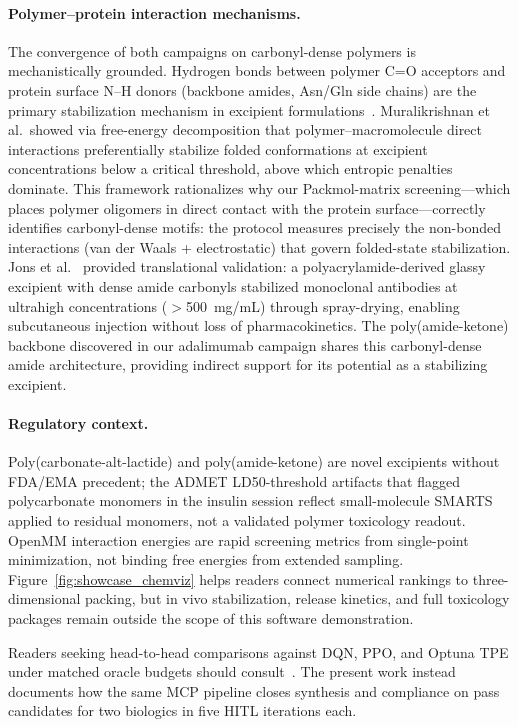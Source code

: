 \documentclass[twocolumn]{fairmeta}
\begin{document}
\paragraph{Polymer--protein interaction mechanisms.}
The convergence of both campaigns on carbonyl-dense polymers is mechanistically grounded.
Hydrogen bonds between polymer C=O acceptors and protein surface N--H donors (backbone amides, Asn/Gln side chains) are the primary stabilization mechanism in excipient formulations~\cite{muralikrishnan2025thermodynamic}.
Muralikrishnan et al.\ showed via free-energy decomposition that polymer--macromolecule direct interactions preferentially stabilize folded conformations at excipient concentrations below a critical threshold, above which entropic penalties dominate.
This framework rationalizes why our Packmol-matrix screening---which places polymer oligomers in direct contact with the protein surface---correctly identifies carbonyl-dense motifs: the protocol measures precisely the non-bonded interactions (van der Waals + electrostatic) that govern folded-state stabilization.
Jons et al.~\cite{jons2025ultrahigh} provided translational validation: a polyacrylamide-derived glassy excipient with dense amide carbonyls stabilized monoclonal antibodies at ultrahigh concentrations ($>$500~mg/mL) through spray-drying, enabling subcutaneous injection without loss of pharmacokinetics.
The poly(amide-ketone) backbone discovered in our adalimumab campaign shares this carbonyl-dense amide architecture, providing indirect support for its potential as a stabilizing excipient.

\paragraph{Regulatory context.}
Poly(carbonate-alt-lactide) and poly(amide-ketone) are novel excipients without FDA/EMA precedent; the ADMET LD50-threshold artifacts that flagged polycarbonate monomers in the insulin session reflect small-molecule SMARTS applied to residual monomers, not a validated polymer toxicology readout.
OpenMM interaction energies are rapid screening metrics from single-point minimization, not binding free energies from extended sampling.
Figure~\ref{fig:showcase_chemviz} helps readers connect numerical rankings to three-dimensional packing, but in vivo stabilization, release kinetics, and full toxicology packages remain outside the scope of this software demonstration.

Readers seeking head-to-head comparisons against DQN, PPO, and Optuna TPE under matched oracle budgets should consult~\cite{martins2026insulin}.
The present work instead documents how the same MCP pipeline closes synthesis and compliance on pass candidates for two biologics in five HITL iterations each.
\end{document}
